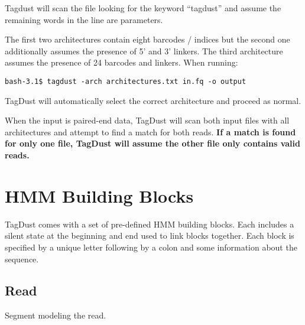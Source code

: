 \documentclass[11pt,a4paper,oneside]{book}
\begin{document}
\vspace{5mm}

Tagdust will scan the file looking for the keyword ``tagdust'' and assume the remaining words in the line are parameters. 

The first two architectures contain eight barcodes / indices but the second one additionally assumes the presence of 5' and 3' linkers. The third architecture assumes the presence of 24 barcodes and linkers. When running: 

\begin{verbatim}
bash-3.1$ tagdust -arch architectures.txt in.fq -o output
\end{verbatim}

TagDust will automatically select the correct architecture and proceed as normal. 

When the input is paired-end data, TagDust will scan both input files with all architectures and attempt to find a match for both reads. {\bf If a match is found for only one file, TagDust will assume the other file only contains valid reads. }



\newpage

\chapter{HMM Building Blocks}
TagDust comes with a set of pre-defined HMM building blocks. Each includes a silent state at the beginning and end used to link blocks together. Each block is specified by a unique letter following by a colon and some information about the sequence. 


\section{Read}
Segment modeling the read. \\

\begin{figure}[H]
\centering
{}
\end{figure}
\end{document}
